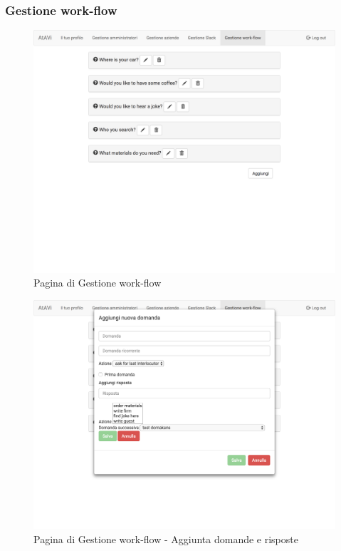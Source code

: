 \documentclass[../ManualeUtente_v2.0.0.tex]{subfiles}
\begin{document}
	\newpage
	\subsubsection{Gestione work-flow}
	\begin{figure}[!h]
		\centering
		\includegraphics[scale=0.24]{Screenshot/admin-manageWorkflow1.png}
		\caption{Pagina di Gestione work-flow}
	\end{figure}
	\newpage
	\begin{figure}[!h]
		\centering
		\includegraphics[scale=0.24]{Screenshot/admin-manageWorkflow2.png}
		\caption{Pagina di Gestione work-flow - Aggiunta domande e risposte}
	\end{figure}
\end{document}
